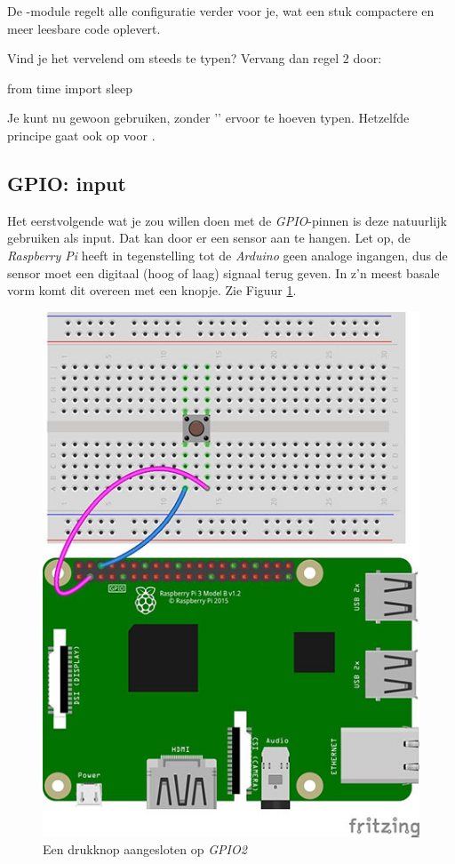 De -module regelt alle configuratie verder voor je, wat een stuk compactere en meer leesbare code oplevert. 

\begin{remark}
Vind je het vervelend om steeds  te typen? Vervang dan regel $2$ door: 
\begin{python}
from time import sleep
\end{python}
Je kunt nu gewoon  gebruiken, zonder '' ervoor te hoeven typen. Hetzelfde principe gaat ook op voor .
\end{remark}

\newpage

\subsection{GPIO: input}
Het eerstvolgende wat je zou willen doen met de \textit{GPIO}-pinnen is deze natuurlijk gebruiken als input. Dat kan door er een sensor aan te hangen. Let op, de \textit{Raspberry Pi} heeft in tegenstelling tot de \textit{Arduino} geen analoge ingangen, dus de sensor moet een digitaal (hoog of laag) signaal terug geven. In z'n meest basale vorm komt dit overeen met een knopje. Zie Figuur \ref{fig:pi_button}. 

\begin{figure}[h!]
\centering\includegraphics[scale=0.45]{Pictures/chapter05/pi_button_01.jpg}
\caption{Een drukknop aangesloten op \textit{GPIO2}}
\label{fig:pi_button} %
\end{figure}

